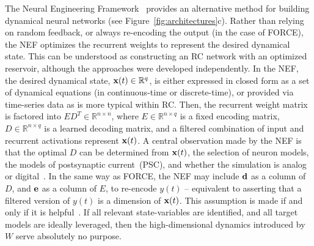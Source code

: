 The Neural Engineering Framework~\citep[NEF;][]{eliasmith1999developing,eliasmith2003a} provides an alternative method for building dynamical neural networks (see Figure~\ref{fig:architectures}c).
Rather than relying on random feedback, or always re-encoding the output (in the case of FORCE), the NEF optimizes the recurrent weights to represent the desired dynamical state.
This can be understood as constructing an RC network with an optimized reservoir, although the approaches were developed independently.
In the NEF, the desired dynamical state, $\mathbf{x}(t) \in \mathbb{R}^q$, is either expressed in closed form as a set of dynamical equations (in continuous-time or discrete-time), or provided via time-series data as is more typical within RC.
Then, the recurrent weight matrix is factored into $ED^T \in \mathbb{R}^{n \times n}$, where $E \in \mathbb{R}^{n \times q}$ is a fixed encoding matrix, $D \in \mathbb{R}^{n \times q}$ is a learned decoding matrix, and a filtered combination of input and recurrent activations represent $\mathbf{x}(t)$.
A central observation made by the NEF is that the optimal $D$ can be determined from $\mathbf{x}(t)$, the selection of neuron models, the models of postsynaptic current~(PSC), and whether the simulation is analog or digital~\citep{voelker2018}.
In the same way as FORCE, the NEF may include $\mathbf{d}$ as a column of $D$, and $\mathbf{e}$ as a column of $E$, to re-encode $y(t)$ -- equivalent to asserting that a filtered version of $y(t)$ is a dimension of $\mathbf{x}(t)$.
This assumption is made if and only if it is helpful~\citep[e.g.,~to perform integration;][]{singh2004}.
If all relevant state-variables are identified, and all target models are ideally leveraged, then the high-dimensional dynamics introduced by $W$ serve absolutely no purpose.

